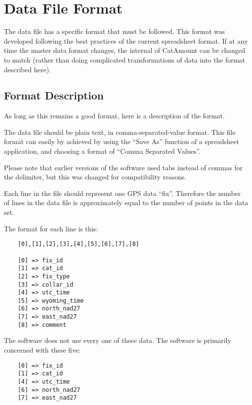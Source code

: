 \chapter{Data File Format}
\hypertarget{data-file-format}{}

The data file has a specific format that must be followed. This format was
developed following the best practices of the current spreadsheet format.
If at any time the master data format changes, the internal of CatAmount
can be changed to match (rather than doing complicated transformations of
data into the format described here).

\section{Format Description}
As long as this remains a good format, here is a description of the format.

The data file should be plain text, in comma-separated-value format.
This file format can easily by achieved by using the ``Save As''
function of a spreadsheet application, and choosing a format of
``Comma Separated Values''.

Please note that earlier versions of the software used tabs instead of
commas for the delimiter, but this was changed for compatibility
reasons.

Each line in the file should represent one GPS data ``fix''. Therefore
the number of lines in the data file is approximately equal to the
number of points in the data set.

The format for each line is this:

\begin{verbatim}
    [0],[1],[2],[3],[4],[5],[6],[7],[8]

    [0] => fix_id
    [1] => cat_id
    [2] => fix_type
    [3] => collar_id
    [4] => utc_time
    [5] => wyoming_time
    [6] => north_nad27
    [7] => east_nad27
    [8] => comment
\end{verbatim}

The software does not use every one of these data. The software is primarily
concerned with these five:

\begin{verbatim}
    [0] => fix_id
    [1] => cat_id
    [4] => utc_time
    [6] => north_nad27
    [7] => east_nad27
\end{verbatim}

